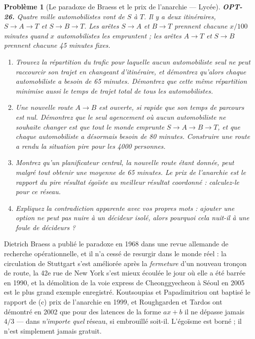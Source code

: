 \documentclass[11pt]{article}
\newtheorem{problem}{Problème}
\begin{document}
\bigskip

\begin{problem}[{Le paradoxe de Braess et le prix de l'anarchie --- Lycée}]
\textbf{OPT-26.} Quatre mille automobilistes vont de $S$ à $T$. Il y a deux itinéraires,
$S \to A \to T$ et $S \to B \to T$. Les arêtes $S \to A$ et $B \to T$ prennent chacune $x/100$
minutes quand $x$ automobilistes les empruntent ; les arêtes $A \to T$ et $S \to B$ prennent chacune
45 minutes fixes.
\begin{enumerate}
\item[(a)] Trouvez la répartition du trafic pour laquelle aucun automobiliste seul ne peut raccourcir son
trajet en changeant d'itinéraire, et démontrez qu'alors chaque automobiliste a besoin de 65 minutes.
Démontrez que cette même répartition minimise aussi le temps de trajet total de tous les
automobilistes.
\item[(b)] Une nouvelle route $A \to B$ est ouverte, si rapide que son temps de parcours est nul.
Démontrez que le seul agencement où aucun automobiliste ne souhaite changer est que \textit{tout le
monde} emprunte $S \to A \to B \to T$, et que chaque automobiliste a désormais besoin de 80
minutes. Construire une route a rendu la situation pire pour les 4000 personnes.
\item[(c)] Montrez qu'un planificateur central, la nouvelle route étant donnée, peut malgré tout obtenir
une moyenne de 65 minutes. Le \textit{prix de l'anarchie} est le rapport du pire résultat égoïste au
meilleur résultat coordonné : calculez-le pour ce réseau.
\item[(d)] Expliquez la contradiction apparente avec vos propres mots : ajouter une option ne peut pas
nuire à un décideur isolé, alors pourquoi cela nuit-il à une foule de décideurs ?
\end{enumerate}

\end{problem}

\noindent Dietrich Braess a publié le paradoxe en 1968 dans une revue allemande de recherche
opérationnelle, et il n'a cessé de resurgir dans le monde réel : la circulation de Stuttgart s'est
améliorée après la \textit{fermeture} d'un nouveau tronçon de route, la 42e rue de New York
s'est mieux écoulée le jour où elle a été barrée en 1990, et la démolition de la voie express de
Cheonggyecheon à Séoul en 2005 est le plus grand exemple enregistré. Koutsoupias et Papadimitriou
ont baptisé le rapport de (c) prix de l'anarchie en 1999, et Roughgarden et Tardos ont démontré en
2002 que pour des latences de la forme $ax + b$ il ne dépasse jamais $4/3$ --- dans \textit{n'importe
quel} réseau, si embrouillé soit-il. L'égoïsme est borné ; il n'est simplement jamais
gratuit.
\end{document}
